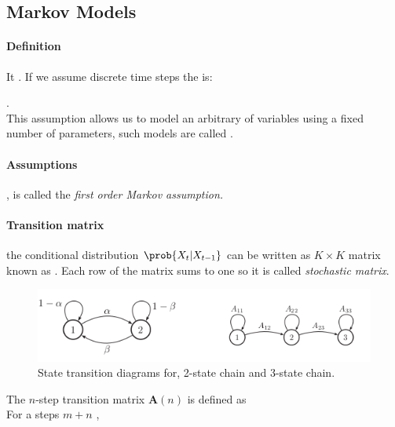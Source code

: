 \subsection{Markov Models}
\paragraph{Definition}
It .
If we assume discrete time steps the  is:
\begin{center}
\end{center}
.\\
This assumption allows us to model an arbitrary of variables using a fixed number of parameters, such
models are called .
\paragraph{Assumptions}
, is called the \emph{first order Markov assumption.}

\paragraph{Transition matrix}
 the conditional distribution $\prob{X_{t}|X_{t-1}}$ can be written as 
$K\times K$ matrix known as . Each row of the matrix sums to one
 so it is called \emph{stochastic matrix}.
\begin{figure}[H]
    \begin{center}
        \includegraphics[width=.5\textwidth]{./chapters/2_statistics/07_hidden_markov_models/1_images/1_state_transition_diagrams.png}
    \end{center}
    \caption{State transition diagrams for, 2-state chain and 3-state chain.}
    \label{fig:1_state_transition_diagrams}
\end{figure}
The $n$-step transition matrix $\bm{A}(n)$ is defined as \\
For a steps $m+n$ , 

